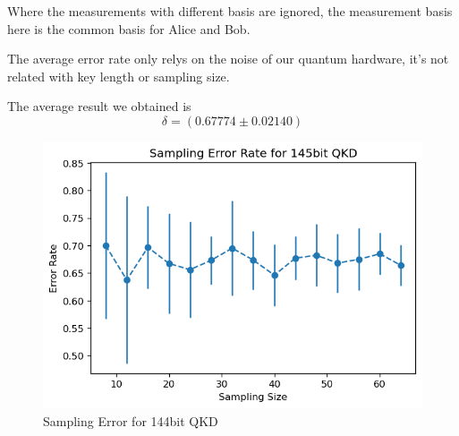 \documentclass[11pt]{article}
\begin{document}


Where the measurements with different basis are ignored, the measurement basis here is the 
common basis for Alice and Bob. 

The average error rate only relys on the noise of our quantum hardware, 
it's not related with key length or sampling size.

The average result we obtained is 
\[
\delta=(0.67774\pm 0.02140)    
\]
\begin{figure}
    \centering
    \includegraphics[]{qkd145_error.png}
    \caption{Sampling Error for 144bit QKD}
\end{figure}
\end{document}
